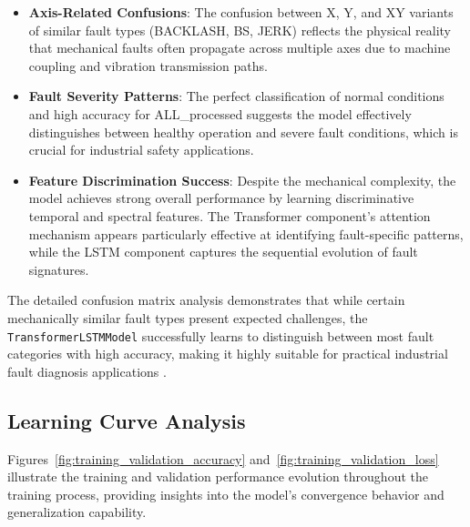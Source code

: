 \begin{itemize}
    \item \textbf{Axis-Related Confusions}: The confusion between X, Y, and XY variants of similar fault types (BACKLASH, BS, JERK) reflects the physical reality that mechanical faults often propagate across multiple axes due to machine coupling and vibration transmission paths.
    
    \item \textbf{Fault Severity Patterns}: The perfect classification of normal conditions and high accuracy for ALL\_processed suggests the model effectively distinguishes between healthy operation and severe fault conditions, which is crucial for industrial safety applications.
    
    \item \textbf{Feature Discrimination Success}: Despite the mechanical complexity, the model achieves strong overall performance by learning discriminative temporal and spectral features. The Transformer component's attention mechanism appears particularly effective at identifying fault-specific patterns, while the LSTM component captures the sequential evolution of fault signatures.
\end{itemize}

The detailed confusion matrix analysis demonstrates that while certain mechanically similar fault types present expected challenges, the \texttt{TransformerLSTMModel} successfully learns to distinguish between most fault categories with high accuracy, making it highly suitable for practical industrial fault diagnosis applications \citep{he2009learning}.

\subsection{Learning Curve Analysis}
\label{subsec:learning_curve_analysis}

Figures~\ref{fig:training_validation_accuracy} and~\ref{fig:training_validation_loss} illustrate the training and validation performance evolution throughout the training process, providing insights into the model's convergence behavior and generalization capability.

